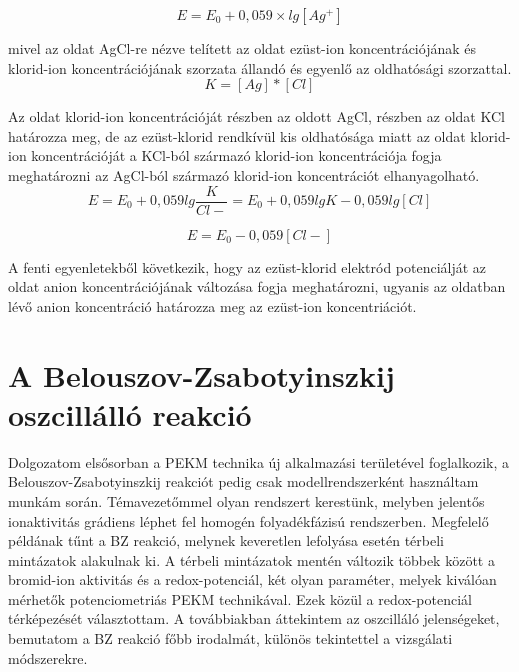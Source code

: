 \begin{enumerate}
\begin{equation}
E = E_0 + 0,059 \times lg [Ag^+]
\end{equation}

mivel az oldat AgCl-re nézve telített az oldat ezüst-ion koncentrációjának és klorid-ion koncentrációjának szorzata állandó és egyenlő az oldhatósági szorzattal.\\

\begin{equation}
K = [Ag] * [Cl]
\end{equation}

Az oldat klorid-ion koncentrációját részben az oldott AgCl, részben az oldat KCl határozza meg, de az ezüst-klorid rendkívül kis oldhatósága miatt az oldat klorid-ion koncentrációját a KCl-ból származó klorid-ion koncentrációja fogja meghatározni az AgCl-ból származó klorid-ion koncentrációt elhanyagolható.\\

\begin{equation}
E = E_\text{0} + 0,059 lg \frac{K}{Cl-} = E_\text{0} + 0,059 lg K - 0,059 lg [Cl]
\end{equation}

\begin{equation}
E = E_\text{0} - 0,059 [Cl-]
\end{equation}

A fenti egyenletekből következik, hogy az ezüst-klorid elektród potenciálját az oldat anion koncentrációjának változása fogja meghatározni, ugyanis az oldatban lévő anion koncentráció határozza meg az ezüst-ion koncentriációt.
\end{enumerate}
    


\section{A Belouszov-Zsabotyinszkij oszcillálló reakció}
Dolgozatom elsősorban a PEKM technika új alkalmazási területével foglalkozik, a Belouszov-Zsabotyinszkij reakciót pedig csak modellrendszerként használtam munkám során. Témavezetőmmel olyan rendszert kerestünk, melyben jelentős ionaktivitás grádiens léphet fel homogén folyadékfázisú rendszerben. Megfelelő példának tűnt a BZ reakció, melynek keveretlen lefolyása esetén térbeli mintázatok alakulnak ki. A térbeli mintázatok mentén változik többek között a bromid-ion aktivitás és a redox-potenciál, két olyan paraméter, melyek kiválóan mérhetők potenciometriás PEKM technikával. Ezek közül a redox-potenciál térképezését választottam. A továbbiakban áttekintem az oszcilláló jelenségeket, bemutatom a BZ reakció főbb irodalmát, különös tekintettel a vizsgálati módszerekre.

